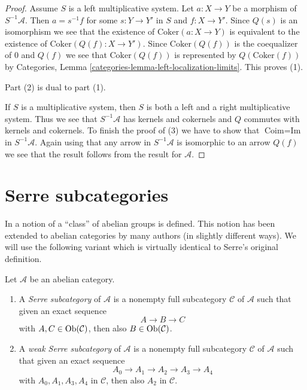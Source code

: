 \begin{proof}
Assume $S$ is a left multiplicative system. Let $a : X \to Y$ be a morphism
of $S^{-1}\mathcal{A}$. Then $a = s^{-1}f$ for some $s : Y \to Y'$
in $S$ and $f : X \to Y'$. Since $Q(s)$ is an isomorphism we see that
the existence of $\text{Coker}(a : X \to Y)$ is equivalent to the existence
of $\text{Coker}(Q(f) : X \to Y')$. Since $\text{Coker}(Q(f))$ is the
coequalizer of $0$ and $Q(f)$ we see that $\text{Coker}(Q(f))$ is
represented by $Q(\text{Coker}(f))$ by
Categories, Lemma \ref{categories-lemma-left-localization-limits}.
This proves (1).

\medskip\noindent
Part (2) is dual to part (1).

\medskip\noindent
If $S$ is a multiplicative system, then $S$ is both a left and a right
multiplicative system. Thus we see that $S^{-1}\mathcal{A}$ has
kernels and cokernels and $Q$ commutes with kernels and cokernels.
To finish the proof of (3) we have to show that $\text{Coim} = \text{Im}$ in
$S^{-1}\mathcal{A}$. Again using that any arrow in $S^{-1}\mathcal{A}$
is isomorphic to an arrow $Q(f)$ we see that the result follows
from the result for $\mathcal{A}$.
\end{proof}



\section{Serre subcategories}
\label{section-serre-subcategories}

\noindent
In \cite[Chapter I, Section 1]{Serre_homotopie_classes}
a notion of a ``class'' of abelian groups is defined.
This notion has been extended to abelian categories by many authors
(in slightly different ways). We will use the following variant
which is virtually identical to Serre's original definition.

\begin{definition}
\label{definition-serre-subcategory}
Let $\mathcal{A}$ be an abelian category.
\begin{enumerate}
\item A {\it Serre subcategory} of $\mathcal{A}$ is a
nonempty full subcategory $\mathcal{C}$ of $\mathcal{A}$
such that given an exact sequence
$$
A \to B \to C
$$
with $A, C \in \mathop{\rm Ob}\nolimits(\mathcal{C})$, then also
$B \in \mathop{\rm Ob}\nolimits(\mathcal{C})$.
\item A {\it weak Serre subcategory} of $\mathcal{A}$ is a nonempty
full subcategory $\mathcal{C}$ of $\mathcal{A}$ such that given an
exact sequence
$$
A_0 \to A_1 \to A_2 \to A_3 \to A_4
$$
with $A_0, A_1, A_3, A_4$ in $\mathcal{C}$, then also $A_2$ in $\mathcal{C}$.
\end{enumerate}
\end{definition}

